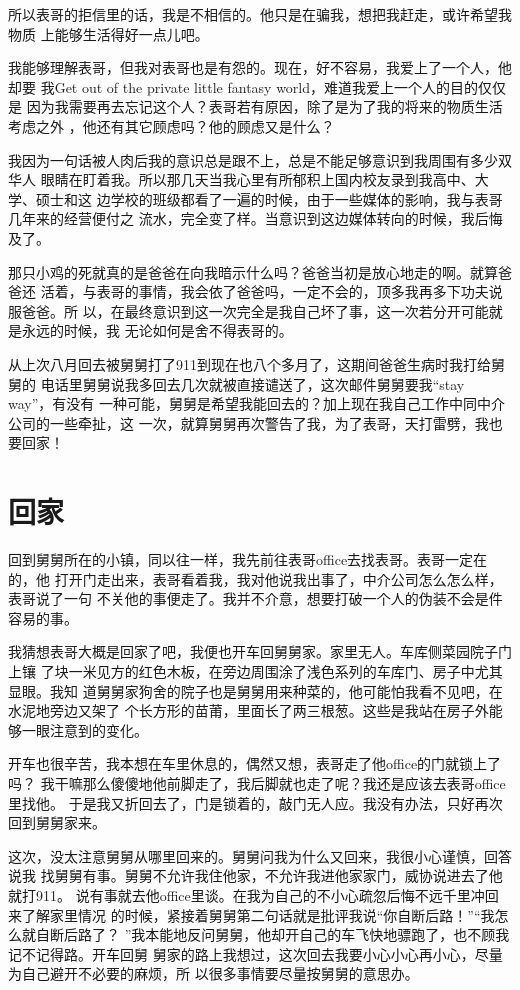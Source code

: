 \documentclass[12pt]{book}
\begin{document}
所以表哥的拒信里的话，我是不相信的。他只是在骗我，想把我赶走，或许希望我物质
上能够生活得好一点儿吧。

我能够理解表哥，但我对表哥也是有怨的。现在，好不容易，我爱上了一个人，他却要
我Get out of the private little fantasy world，难道我爱上一个人的目的仅仅是
因为我需要再去忘记这个人？表哥若有原因，除了是为了我的将来的物质生活考虑之外
，他还有其它顾虑吗？他的顾虑又是什么？

我因为一句话被人肉后我的意识总是跟不上，总是不能足够意识到我周围有多少双华人
眼睛在盯着我。所以那几天当我心里有所郁积上国内校友录到我高中、大学、硕士和这
边学校的班级都看了一遍的时候，由于一些媒体的影响，我与表哥几年来的经营便付之
流水，完全变了样。当意识到这边媒体转向的时候，我后悔及了。

那只小鸡的死就真的是爸爸在向我暗示什么吗？爸爸当初是放心地走的啊。就算爸爸还
活着，与表哥的事情，我会依了爸爸吗，一定不会的，顶多我再多下功夫说服爸爸。所
以，在最终意识到这一次完全是我自己坏了事，这一次若分开可能就是永远的时候，我
无论如何是舍不得表哥的。

从上次八月回去被舅舅打了911到现在也八个多月了，这期间爸爸生病时我打给舅舅的
电话里舅舅说我多回去几次就被直接谴送了，这次邮件舅舅要我“stay way”，有没有
一种可能，舅舅是希望我能回去的？加上现在我自己工作中同中介公司的一些牵扯，这
一次，就算舅舅再次警告了我，为了表哥，天打雷劈，我也要回家！
\section{回家}
\label{sec-9-72}

回到舅舅所在的小镇，同以往一样，我先前往表哥office去找表哥。表哥一定在的，他
打开门走出来，表哥看着我，我对他说我出事了，中介公司怎么怎么样，表哥说了一句
不关他的事便走了。我并不介意，想要打破一个人的伪装不会是件容易的事。

我猜想表哥大概是回家了吧，我便也开车回舅舅家。家里无人。车库侧菜园院子门上镶
了块一米见方的红色木板，在旁边周围涂了浅色系列的车库门、房子中尤其显眼。我知
道舅舅家狗舍的院子也是舅舅用来种菜的，他可能怕我看不见吧，在水泥地旁边又架了
个长方形的苗莆，里面长了两三根葱。这些是我站在房子外能够一眼注意到的变化。

开车也很辛苦，我本想在车里休息的，偶然又想，表哥走了他office的门就锁上了吗？
我干嘛那么傻傻地他前脚走了，我后脚就也走了呢？我还是应该去表哥office里找他。
于是我又折回去了，门是锁着的，敲门无人应。我没有办法，只好再次回到舅舅家来。

这次，没太注意舅舅从哪里回来的。舅舅问我为什么又回来，我很小心谨慎，回答说我
找舅舅有事。舅舅不允许我住他家，不允许我进他家家门，威协说进去了他就打911。
说有事就去他office里谈。在我为自己的不小心疏忽后悔不远千里冲回来了解家里情况
的时候，紧接着舅舅第二句话就是批评我说“你自断后路！”“我怎么就自断后路了？
”我本能地反问舅舅，他却开自己的车飞快地骠跑了，也不顾我记不记得路。开车回舅
舅家的路上我想过，这次回去我要小心小心再小心，尽量为自己避开不必要的麻烦，所
以很多事情要尽量按舅舅的意思办。
\end{document}
